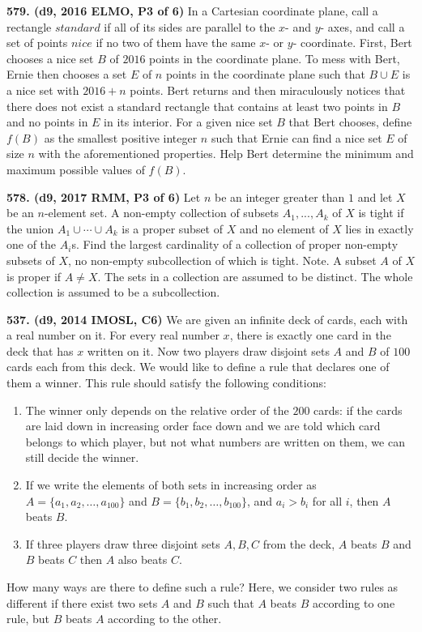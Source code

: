 \documentclass{article}
\begin{document}
\textbf{579. (\color{red}d9\color{black}, 2016 ELMO, P3 of 6)} In a Cartesian coordinate plane, call a rectangle $standard$ if all of its sides are parallel to the $x$- and $y$- axes, and call a set of points $nice$ if no two of them have the same $x$- or $y$- coordinate. First, Bert chooses a nice set $B$ of $2016$ points in the coordinate plane. To mess with Bert, Ernie then chooses a set $E$ of $n$ points in the coordinate plane such that $B\cup E$ is a nice set with $2016+n$ points. Bert returns and then miraculously notices that there does not exist a standard rectangle that contains at least two points in $B$ and no points in $E$ in its interior. For a given nice set $B$ that Bert chooses, define $f(B)$ as the smallest positive integer $n$ such that Ernie can find a nice set $E$ of size $n$ with the aforementioned properties. Help Bert determine the minimum and maximum possible values of $f(B)$.

\textbf{578. (\color{red}d9\color{black}, 2017 RMM, P3 of 6)} Let $n$ be an integer greater than $1$ and let $X$ be an $n$-element set. A non-empty collection of subsets $A_1, ..., A_k$ of $X$ is tight if the union $A_1 \cup \cdots  \cup A_k$ is a proper subset of $X$ and no element of $X$ lies in exactly one of the $A_i$s. Find the largest cardinality of a collection of proper non-empty subsets of $X$, no non-empty subcollection of which is tight.
\smallbreak
Note. A subset $A$ of $X$ is proper if $A\neq X$. The sets in a collection are assumed to be distinct. The whole collection is assumed to be a subcollection.

\textbf{537. (\color{red}d9\color{black}, 2014 IMOSL, C6)} We are given an infinite deck of cards, each with a real number on it. For every real number $x$, there is exactly one card in the deck that has $x$ written on it. Now two players draw disjoint sets $A$ and $B$ of $100$ cards each from this deck. We would like to define a rule that declares one of them a winner. This rule should satisfy the following conditions:
\begin{enumerate}
        \item The winner only depends on the relative order of the $200$ cards: if the cards are laid down in increasing order face down and we are told which card belongs to which player, but not what numbers are written on them, we can still decide the winner.
        \item If we write the elements of both sets in increasing order as $A =\{ a_1 , a_2 , \ldots, a_{100} \}$ and $B= \{ b_1 , b_2 , \ldots , b_{100} \}$, and $a_i > b_i$ for all $i$, then $A$ beats $B$.
        \item If three players draw three disjoint sets $A, B, C$ from the deck, $A$ beats $B$ and $B$ beats $C$ then $A$ also beats $C$.
\end{enumerate}
How many ways are there to define such a rule? Here, we consider two rules as different if there exist two sets $A$ and $B$ such that $A$ beats $B$ according to one rule, but $B$ beats $A$ according to the other.
\end{document}
